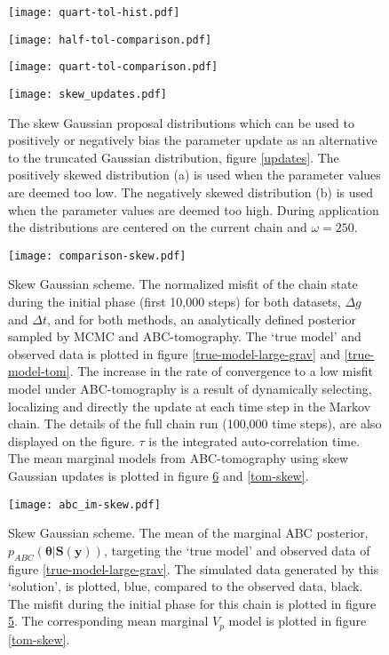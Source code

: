 \begin{figure}[H]
	\centering
	\texttt{[image: quart-tol-hist.pdf]}
	\caption{}
	\label{pdf-quart-tol}
\end{figure}

\begin{figure}[H]
	\centering
	\texttt{[image: half-tol-comparison.pdf]}
	\caption{}
	\label{comparison-half-tol}
\end{figure}

\begin{figure}[H]
	\centering
	\texttt{[image: quart-tol-comparison.pdf]}
	\caption{}
	\label{comparison-quart-tol}
\end{figure}

\begin{figure}[H]
	\centering
	\texttt{[image: skew\_updates.pdf]}
	\caption{The skew Gaussian proposal distributions which can be used to positively or negatively bias the parameter update as an alternative to the truncated Gaussian distribution, figure \ref{updates}. The positively skewed distribution (a) is used when the parameter values are deemed too low. The negatively skewed distribution (b) is used when the parameter values are deemed too high. During application the distributions are centered on the current chain and $\omega = 250$.}
	\label{skew-updates}
\end{figure}

\begin{figure}[H]
	\centering
	\texttt{[image: comparison-skew.pdf]}
	\caption{Skew Gaussian scheme. The normalized misfit of the chain state during the initial phase (first 10,000 steps) for both datasets, $\Delta g$ and $\Delta t$, and for both methods, an analytically defined posterior sampled by MCMC and ABC-tomography. The `true model' and observed data is plotted in figure \ref{true-model-large-grav} and \ref{true-model-tom}. The increase in the rate of convergence to a low misfit model under ABC-tomography is a result of dynamically selecting, localizing and directly the update at each time step in the Markov chain. The details of the full chain run (100,000 time steps), are also displayed on the figure. $\tau$ is the integrated auto-correlation time. The mean marginal models from ABC-tomography using skew Gaussian updates is plotted in figure \ref{grav-skew} and \ref{tom-skew}.}
	\label{comparison-skew}
\end{figure}

\begin{figure}[H]
	\centering
	\texttt{[image: abc\_im-skew.pdf]}
	\caption{Skew Gaussian scheme. The mean of the marginal ABC posterior, $p_{ABC}(\bm{\theta}|\bm{S}(\bm{y}))$, targeting the `true model' and observed data of figure \ref{true-model-large-grav}. The simulated data generated by this `solution', is plotted, blue, compared to the observed data, black. The misfit during the initial phase for this chain is plotted in figure \ref{comparison-skew}. The corresponding mean marginal $V_p$ model is plotted in figure \ref{tom-skew}.}
	\label{grav-skew}
\end{figure}

